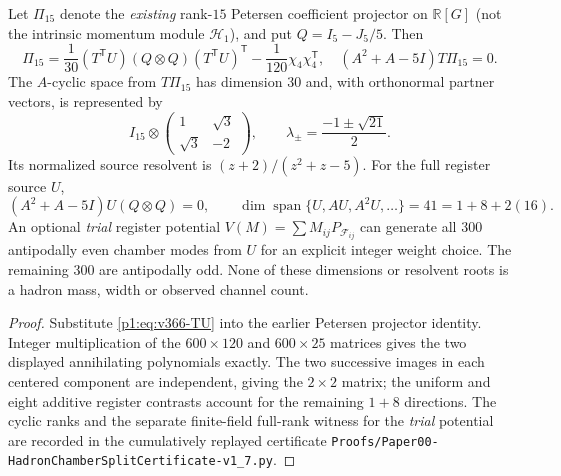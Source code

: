 \documentclass[11pt]{article}
\begin{document}
\begin{theorem}
\label{p1:thm:v366-petersen-face-walk}
Let $\Pi_{15}$ denote the \emph{existing} rank-$15$ Petersen
coefficient projector on $\mathbb R[G]$ (not the intrinsic momentum
module $\mathcal H_1$), and put $Q=I_5-J_5/5$.  Then
\[
 \Pi_{15}=\frac1{30}(T^{\mathsf T}U)
   (Q\otimes Q)(T^{\mathsf T}U)^{\mathsf T}
   -\frac1{120}\chi_4\chi_4^{\mathsf T},
\quad (A^2+A-5I)T\Pi_{15}=0.
\]
The $A$-cyclic space from $T\Pi_{15}$ has dimension $30$ and,
with orthonormal partner vectors, is represented by
\[
 I_{15}\otimes\begin{pmatrix}1&\sqrt3\\\sqrt3&-2\end{pmatrix},
 \qquad \lambda_{\pm}=\frac{-1\pm\sqrt{21}}2.
\]
Its normalized source resolvent is $(z+2)/(z^2+z-5)$.
For the full register source $U$,
\[
 (A^2+A-5I)U(Q\otimes Q)=0,\qquad
 \dim\operatorname{span}\{U,AU,A^2U,\ldots\}=41=1+8+2(16).
\]
An optional \emph{trial} register potential $V(M)=\sum M_{ij}
P_{\mathscr F_{ij}}$ can generate all $300$ antipodally even chamber
modes from $U$ for an explicit integer weight choice.  The remaining
$300$ are antipodally odd.  None of these dimensions or resolvent
roots is a hadron mass, width or observed channel count.
\end{theorem}
\begin{proof}
Substitute \eqref{p1:eq:v366-TU} into the earlier Petersen projector
identity.  Integer multiplication of the $600\times120$ and
$600\times25$ matrices gives the two displayed annihilating
polynomials exactly.  The two successive images in each centered
component are independent, giving the $2\times2$ matrix; the
uniform and eight additive register contrasts account for the
remaining $1+8$ directions.  The cyclic ranks and the separate
finite-field full-rank witness for the \emph{trial} potential are
recorded in the cumulatively replayed certificate
\texttt{Proofs/Paper00-HadronChamberSplitCertificate-v1\_7.py}.
\end{proof}
\end{document}
